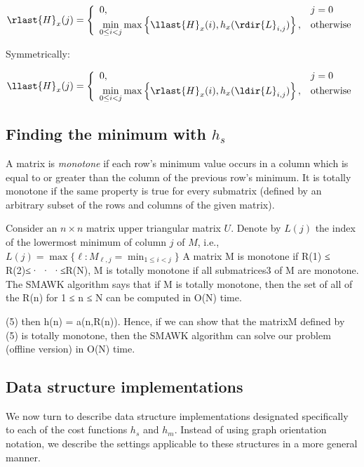 \begin{equation}\label{eq:Hr}
\rlast{H}_x(j) = \left\{\begin{array}{ll}
0, & j = 0\\
\min\limits_{0 \leq i < j}\max\left\{\llast{H}_x(i), h_x(\rdir{L}_{i, j})\right\}, & \text{otherwise}\\
\end{array}\right.
\end{equation}

Symmetrically: 

\begin{equation}\label{eq:Hl}
\llast{H}_x(j) = \left\{\begin{array}{ll}
0, & j = 0\\
\min\limits_{0 \leq i < j}\max\left\{\rlast{H}_x(i), h_x(\ldir{L}_{i, j})\right\}, & \text{otherwise}\\
\end{array}\right.
\end{equation}

\subsection{Finding the minimum with $h_s$}
\begin{definition}
A matrix is \emph{monotone} if each row's minimum value occurs in a column which is equal to or greater than the column of the previous row's minimum. It is totally monotone if the same property is true for every submatrix (defined by an arbitrary subset of the rows and columns of the given matrix). 
\end{definition}
Consider an $n\times n$ matrix upper triangular matrix $U$. Denote
by $L(j)$ the index of the lowermost minimum of column $j$ of $M$, i.e.,
$L(j) = \max\{\ell :M_{\ell,j}= \min_{1\leq i<j}\}$
A matrix M is monotone if R(1) ≤ R(2)≤· · ·≤R(N), M is totally monotone if all
submatrices3 of M are monotone. The SMAWK algorithm says that if M is totally
monotone, then the set of all of the R(n) for 1 ≤ n ≤ N can be computed in O(N)
time.

(5)
then h(n) = a(n,R(n)). Hence, if we can show that the matrixM defined by (5) is totally
monotone, then the SMAWK algorithm can solve our problem (offline version)
in O(N) time.

\subsection{Data structure implementations}
We now turn to describe data structure implementations designated specifically to each of the cost functions $h_s$ and $h_m$. Instead of using graph orientation notation, we describe the settings applicable to these structures in a more general manner.

